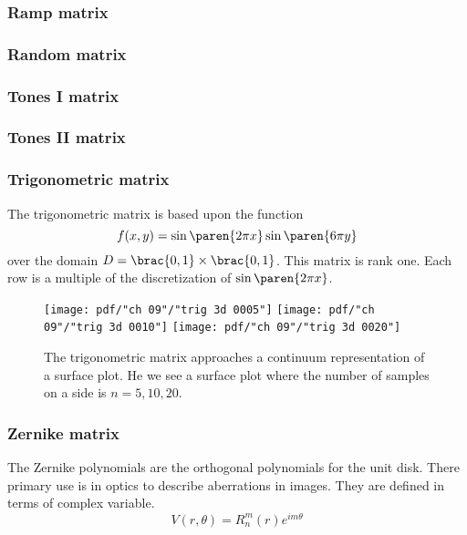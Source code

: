 \subsubsection{Ramp matrix}
\subsubsection{Random matrix}
\subsubsection{Tones I matrix}
\subsubsection{Tones II matrix}
\subsubsection{Trigonometric matrix}
The trigonometric matrix is based upon the function
\begin{equation}
  f(x,y) = \sin \paren{2\pi x} \sin \paren{6\pi y}
\end{equation}
over the domain $D = \brac{0,1} \times \brac{0,1}$.
This matrix is rank one. Each row is a multiple of the discretization of $\sin \paren{2\pi x}$.\\
\begin{figure}[htbp] %
   \centering
   \texttt{[image: pdf/"ch 09"/"trig 3d 0005"]} \quad
   \texttt{[image: pdf/"ch 09"/"trig 3d 0010"]} \quad 
   \texttt{[image: pdf/"ch 09"/"trig 3d 0020"]} 
   \caption[The trigonometric matrix approaches a continuum representation]{The trigonometric matrix approaches a continuum representation of a surface plot. He we see a surface plot where the number of samples on a side is $n=5,10,20$.}
   \label{fig:9:trig}
\end{figure}
\subsubsection{Zernike matrix}
The Zernike polynomials are the orthogonal polynomials for the unit disk. There primary use is in optics to describe aberrations in images. They are defined in terms of complex variable.
\begin{equation}
  V(r,\theta) = R_{n}^{m}(r) e^{i m \theta}
\end{equation}

